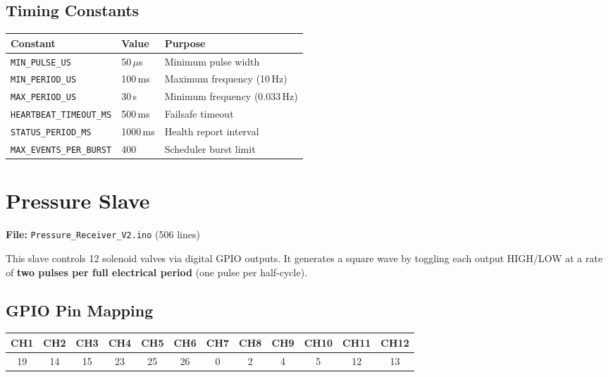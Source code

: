 \documentclass[11pt,a4paper]{article}
\begin{document}
\subsection{Timing Constants}

\begin{center}
\begin{tabular}{llp{6cm}}
\toprule
\textbf{Constant} & \textbf{Value} & \textbf{Purpose} \\
\midrule
\texttt{MIN\_PULSE\_US}   & 50\,$\mu$s   & Minimum pulse width \\
\texttt{MIN\_PERIOD\_US}  & 100\,ms      & Maximum frequency (10\,Hz) \\
\texttt{MAX\_PERIOD\_US}  & 30\,s        & Minimum frequency (0.033\,Hz) \\
\texttt{HEARTBEAT\_TIMEOUT\_MS} & 500\,ms & Failsafe timeout \\
\texttt{STATUS\_PERIOD\_MS}     & 1000\,ms & Health report interval \\
\texttt{MAX\_EVENTS\_PER\_BURST} & 400    & Scheduler burst limit \\
\bottomrule
\end{tabular}
\end{center}

\section{Pressure Slave}

\textbf{File:} \texttt{Pressure\_Receiver\_V2.ino} (506 lines)

This slave controls 12 solenoid valves via digital GPIO outputs. It generates
a square wave by toggling each output HIGH/LOW at a rate of \textbf{two pulses
per full electrical period} (one pulse per half-cycle).

\subsection{GPIO Pin Mapping}

\begin{center}
\begin{tabular}{cccccccccccc}
\toprule
CH1 & CH2 & CH3 & CH4 & CH5 & CH6 & CH7 & CH8 & CH9 & CH10 & CH11 & CH12 \\
\midrule
19 & 14 & 15 & 23 & 25 & 26 & 0 & 2 & 4 & 5 & 12 & 13 \\
\bottomrule
\end{tabular}
\end{center}
\end{document}
